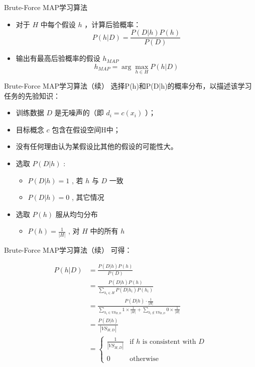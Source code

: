 \documentclass[presentation]{beamer}
\begin{document}
\begin{frame}[label={sec:orgb6ea4dd}]{Brute-Force MAP学习算法}
\begin{itemize}
\item 对于 \(H\) 中每个假设 \(h\) ，计算后验概率：
$$P(h|D) = \frac{P(D|h) P(h)}{P(D)}$$
\item 输出有最高后验概率的假设 \(h_{MAP}\) 
$$h_{MAP} = \arg \max_{h \in H} P(h|D)$$
\end{itemize}
\end{frame}

\begin{frame}[label={sec:org3d94a89}]{Brute-Force MAP学习算法（续）}
选择P(h)和P(D|h)的概率分布，以描述该学习任务的先验知识：
\begin{itemize}
\item 训练数据 \(D\) 是无噪声的（即 \(d_i=c(x_i)\) ）；
\item 目标概念 \(c\) 包含在假设空间H中；
\item 没有任何理由认为某假设比其他的假设的可能性大。
\item 选取 \(P(D|h)\) :
\begin{itemize}
\item \(P(D|h)=1\) , 若 \(h\) 与 \(D\) 一致
\item \(P(D|h)=0\) , 其它情况
\end{itemize}
\item 选取 \(P(h)\) 服从均匀分布
\begin{itemize}
\item \(P(h) = \frac{1}{|H|}\) , 对 \(H\) 中的所有 \(h\)
\end{itemize}
\end{itemize}
\end{frame}

\begin{frame}[label={sec:org35cecce}]{Brute-Force MAP学习算法（续）}
可得：

\begin{align*}
P(h|D) &=\frac{P(D|h)P(h)}{P(D)}\\
&=\frac{P(D|h)P(h)}{\sum_{h_i\in H}P(D|h_i)P(h_i)}\\
&=\frac{P(D|h)\cdot \frac{1}{|H|}}{\sum_{h_i\in VS_{H,D}}1\times \frac{1}{|H|}+\sum_{h_i\not\in VS_{H,D}}0\times \frac{1}{|H|}}\\
&=\frac{P(D|h)}{|VS_{H,D}|}\\
&= \left\{ \begin{array}{cl}
  \frac{1}{|VS_{H,D}|} & \mbox{if $h$ is consistent with $D$} \\
\\
  0  & \mbox{otherwise} 
\end{array} \right.
\end{align*}
\end{frame}
\end{document}
